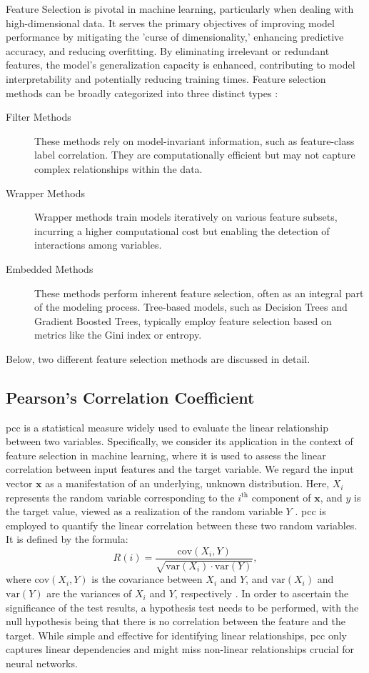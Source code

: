 \documentclass[12pt, a4paper, headinclude, twoside, plainheadsepline, open=right, numbers=noenddot, hidelinks, toc=listof, toc=bibliography]{scrreprt}
\begin{document}
Feature Selection is pivotal in machine learning, particularly when dealing with high-dimensional data. It serves the primary objectives of improving model performance by mitigating the 'curse of dimensionality,' enhancing predictive accuracy, and reducing overfitting. By eliminating irrelevant or redundant features, the model's generalization capacity is enhanced, contributing to model interpretability and potentially reducing training times.
Feature selection methods can be broadly categorized into three distinct types \cite{jovicReviewFeatureSelection2015}:
\begin{description}
\item[Filter Methods] These methods rely on model-invariant information, such as feature-class label correlation. They are computationally efficient but may not capture complex relationships within the data.
\item[Wrapper Methods] Wrapper methods train models iteratively on various feature subsets, incurring a higher computational cost but enabling the detection of interactions among variables.
\item[Embedded Methods] These methods perform inherent feature selection, often as an integral part of the modeling process. Tree-based models, such as Decision Trees and Gradient Boosted Trees, typically employ feature selection based on metrics like the Gini index or entropy.
\end{description}
Below, two different feature selection methods are discussed in detail.

\subsection{Pearson's Correlation Coefficient}
\label{ssec:pearsons}
\Ac{pcc} is a statistical measure widely used to evaluate the linear relationship between two variables. 
Specifically, we consider its application in the context of feature selection in machine learning, where it is used to assess the linear correlation between input features and the target variable. 
We regard the input vector $\mathbf{x}$ as a manifestation of an underlying, unknown distribution. 
Here, $X_i$ represents the random variable corresponding to the $i^{\text{th}}$ component of $\mathbf{x}$, and $y$ is the target value, viewed as a realization of the random variable $Y$ \cite{guyonIntroductionVariableFeature}. 
\Ac{pcc} is employed to quantify the linear correlation between these two random variables. It is defined by the formula:
\begin{equation}
R(i) = \frac{\text{cov}(X_i, Y)}{\sqrt{\text{var}(X_i) \cdot \text{var}(Y)}},
\end{equation}
where $\text{cov}(X_i, Y)$ is the covariance between $X_i$ and $Y$, and $\text{var}(X_i)$ and $\text{var}(Y)$ are the variances of $X_i$ and $Y$, respectively \cite{chandrashekarSurveyFeatureSelection2014}.
In order to ascertain the significance of the test results, a hypothesis test needs to be performed, with the null hypothesis being that there is no correlation between the feature and the target.
While simple and effective for identifying linear relationships, \ac{pcc} only captures linear dependencies and might miss non-linear relationships crucial for neural networks.
\end{document}
